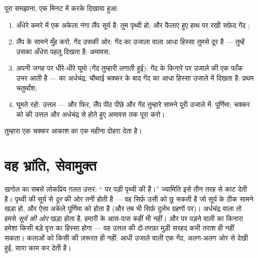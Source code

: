 \begin{method}[पृथ्वी बन जाओ, चंद्रमा हाथ में पकड़ो]\label{met:g7:moon-phases:walk}
पूरा समझाना, एक मिनट में करके दिखाया हुआ:
\begin{enumerate}
  \item अँधेरे कमरे में एक अकेला नंगा लैंप सूर्य है; तुम पृथ्वी हो;
        और फैलाए हुए हाथ पर रखी सफ़ेद गेंद ;
  \item लैंप के सामने मुँह करो, गेंद उसकी ओर: गेंद का उजाला वाला आधा
        हिस्सा तुमसे दूर है --- तुम्हें उसका अँधेरा पहलू दिखता है:
        अमावस;
  \item अपनी जगह पर धीरे-धीरे घूमो (गेंद तुम्हारी  लगाती हुई):
        गेंद के किनारे पर उजाले की एक फाँक उभर आती है --- 
        का अर्धचंद्र; चौथाई चक्कर के बाद गेंद का आधा हिस्सा उजाले में
        दिखता है: प्रथम चतुर्थांश;
  \item घूमते रहो: उत्तल  --- और फिर, लैंप पीठ पीछे और गेंद
        तुम्हारे सामने पूरी उजाले में: पूर्णिमा; चक्कर को 
        की उत्तल  और अर्धचंद्र से होते हुए अमावस तक पूरा करो।
\end{enumerate}
तुम्हारा एक चक्कर आकाश का एक महीना दोहरा देता है।
\end{method}

\section{वह भ्रांति, सेवामुक्त}

\begin{proposition}[कलाएँ पृथ्वी की छाया नहीं हैं]\label{prop:g7:moon-phases:notshadow}
खगोल का सबसे लोकप्रिय ग़लत उत्तर: ``  पर पड़ी पृथ्वी की
 हैं।'' ज्यामिति इसे तीन तरह से काट देती है। पृथ्वी की  सूर्य
से \emph{दूर} की ओर तनी होती है --- वह सिर्फ़ उसी  को छू सकती
है जो सूर्य के ठीक सामने खड़ा हो, और ऐसा अकेले पूर्णिमा को होता है
(और तब भी सिर्फ़ दुर्लभ ग्रहणों पर)। अर्धचंद्र वाला  तो हमसे
\emph{सूर्य की ओर} खड़ा होता है, हमारी  के आस-पास कहीं भी नहीं।
और  पर पड़ने वाली  का किनारा हमेशा किसी बड़े वृत्त का
हिस्सा होगा --- वह उत्तल  की दो-तरफ़ा मुड़ी सरहद कभी तराश ही नहीं
सकता। कलाओं को किसी  की ज़रूरत ही नहीं: आधी उजाले वाली एक गेंद,
अलग-अलग ओर से देखी हुई, सारा काम कर देती है।
\end{proposition}

